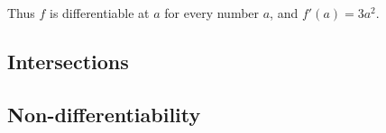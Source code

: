 Thus $f$ is differentiable at $a$ for every number $a$, and $f'(a)=3a^2$.

\subsection{Intersections}

\subsection{Non-differentiability}

